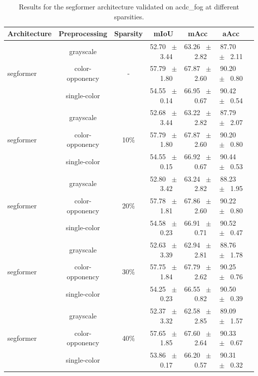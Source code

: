 \begin{table}[h]
  \centering
  \caption{Results for the segformer architecture validated on acdc_fog at different sparsities.}
  \begin{tabular}{@{}lccc ccc@{}}
    \toprule
    Architecture & Preprocessing & Sparsity & mIoU & mAcc & aAcc \\
    \midrule

    \multirow{3}{*}{segformer} & grayscale & \multirow{3}{*}{-} & 52.70 ~$\pm$~ 3.44 & 63.26 ~$\pm$~ 2.82 & 87.70 ~$\pm$~ 2.11 \\
    & color-opponency &  & 57.79 ~$\pm$~ 1.80 & 67.87 ~$\pm$~ 2.60 & 90.20 ~$\pm$~ 0.80 \\
    & single-color &  & 54.55 ~$\pm$~ 0.14 & 66.95 ~$\pm$~ 0.67 & 90.42 ~$\pm$~ 0.54 \\
    \midrule
    \multirow{3}{*}{segformer} & grayscale & \multirow{3}{*}{10\%} & 52.68 ~$\pm$~ 3.44 & 63.22 ~$\pm$~ 2.82 & 87.79 ~$\pm$~ 2.07 \\
    & color-opponency &  & 57.79 ~$\pm$~ 1.80 & 67.87 ~$\pm$~ 2.60 & 90.20 ~$\pm$~ 0.80 \\
    & single-color &  & 54.55 ~$\pm$~ 0.15 & 66.92 ~$\pm$~ 0.67 & 90.44 ~$\pm$~ 0.53 \\
    \midrule
    \multirow{3}{*}{segformer} & grayscale & \multirow{3}{*}{20\%} & 52.80 ~$\pm$~ 3.42 & 63.24 ~$\pm$~ 2.82 & 88.23 ~$\pm$~ 1.95 \\
    & color-opponency &  & 57.78 ~$\pm$~ 1.81 & 67.86 ~$\pm$~ 2.60 & 90.22 ~$\pm$~ 0.80 \\
    & single-color &  & 54.58 ~$\pm$~ 0.23 & 66.91 ~$\pm$~ 0.71 & 90.52 ~$\pm$~ 0.47 \\
    \midrule
    \multirow{3}{*}{segformer} & grayscale & \multirow{3}{*}{30\%} & 52.63 ~$\pm$~ 3.39 & 62.94 ~$\pm$~ 2.81 & 88.76 ~$\pm$~ 1.78 \\
    & color-opponency &  & 57.75 ~$\pm$~ 1.84 & 67.79 ~$\pm$~ 2.62 & 90.25 ~$\pm$~ 0.76 \\
    & single-color &  & 54.25 ~$\pm$~ 0.23 & 66.55 ~$\pm$~ 0.82 & 90.50 ~$\pm$~ 0.39 \\
    \midrule
    \multirow{3}{*}{segformer} & grayscale & \multirow{3}{*}{40\%} & 52.37 ~$\pm$~ 3.32 & 62.58 ~$\pm$~ 2.85 & 89.09 ~$\pm$~ 1.57 \\
    & color-opponency &  & 57.65 ~$\pm$~ 1.85 & 67.60 ~$\pm$~ 2.64 & 90.33 ~$\pm$~ 0.67 \\
    & single-color &  & 53.86 ~$\pm$~ 0.17 & 66.20 ~$\pm$~ 0.57 & 90.31 ~$\pm$~ 0.32 \\

\end{tabular}
\end{table}
